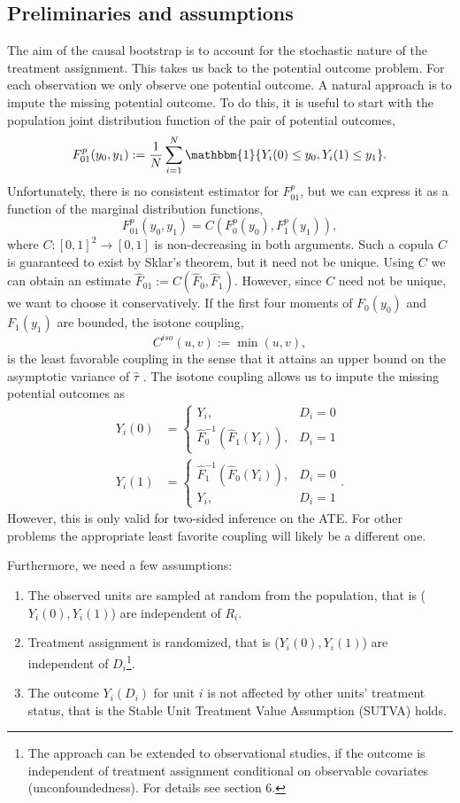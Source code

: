\documentclass[aodsor,preprint]{imsart}
\numberwithin{equation}{section}
\theoremstyle{plain}
\newcommand{\ind}{\mathbbm{1}} %
\begin{document}
\subsection{Preliminaries and assumptions}
The aim of the causal bootstrap is to account for the stochastic nature of the treatment assignment. This takes us back to the potential outcome problem. For each observation we only observe one potential outcome. A natural approach is to impute the missing potential outcome. To do this, it is useful to start with the population joint distribution function of the pair of potential outcomes,
$$
F_{01}^p (y_0, y_1) := \frac{1}{N} \sum_{i = 1}^{N} \ind\{Y_i(0) \leq y_0, Y_i(1) \leq y_1\}.
$$
Unfortunately, there is no consistent estimator for $F_{01}^p$, but we can express it as a function of the marginal distribution functions,
$$
F_{01}^p (y_0, y_1) = C(F_0^p(y_0), F_1^p(y_1)),
$$
where $C: [0, 1]^2 \to [0, 1]$ is non-decreasing in both arguments. Such a copula $C$ is guaranteed to exist by Sklar's theorem, but it need not be unique. Using $C$ we can obtain an estimate $\widehat{F}_{01} := C(\widehat{F}_0, \widehat{F}_1)$. However, since $C$ need not be unique, we want to choose it conservatively. If the first four moments of $F_0(y_0)$ and $F_1(y_1)$ are bounded, the isotone coupling,
$$
C^{iso}(u, v) := \min(u, v),
$$
is the least favorable coupling in the sense that it attains an upper bound on the asymptotic variance of $\widehat{\tau}$ \citep[][sections 2.4 and 2.5]{Imbens_2021}. The isotone coupling allows us to impute the missing potential outcomes as
\begin{align} \label{imputation1}
	Y_i(0) &= \begin{cases}
		Y_i, & D_i = 0 \\
		\widehat{F}_0^{-1}(\widehat{F}_1(Y_i)), & D_i = 1
	\end{cases} \\
	\label{imputation2}
	Y_i(1) &= \begin{cases}
		\widehat{F}_1^{-1}(\widehat{F}_0(Y_i)), & D_i = 0 \\
		Y_i, & D_i = 1
	\end{cases}.
\end{align}
However, this is only valid for two-sided inference on the ATE. For other problems the appropriate least favorite coupling will likely be a different one.

Furthermore, we need a few assumptions:
\begin{enumerate}
	\item The observed units are sampled at random from the population, that is ($Y_i(0), Y_i(1)$) are independent of $R_i$.
	\item Treatment assignment is randomized, that is ($Y_i(0), Y_i(1)$) are independent of $D_i$\footnote{The approach can be extended to observational studies, if the outcome is independent of treatment assignment conditional on observable covariates (unconfoundedness). For details see \cite{Imbens_2021} section 6.}.
	\item The outcome $Y_i(D_i)$ for unit $i$ is not affected by other units' treatment status, that is the Stable Unit Treatment Value Assumption (SUTVA) holds.
\end{enumerate}
\end{document}
